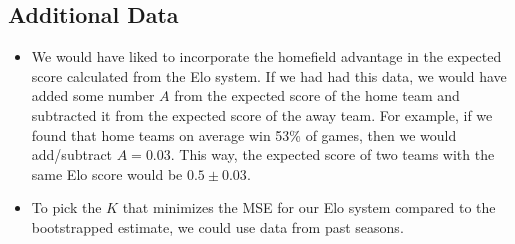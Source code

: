 \documentclass{article}
\begin{document}
\subsection{Additional Data}
\begin{itemize}
    \item We would have liked to incorporate the homefield advantage in the expected score calculated from the Elo system. If we had had this data, we would have added some number $A$ from the expected score of the home team and subtracted it from the expected score of the away team. For example, if we found that home teams on average win 53\% of games, then we would add/subtract $A=0.03$. This way, the expected score of two teams with the same Elo score would be $0.5 \pm 0.03$. 
    \item To pick the $K$ that minimizes the MSE for our Elo system compared to the bootstrapped estimate, we could use data from past seasons.
\end{itemize}



\end{document}
